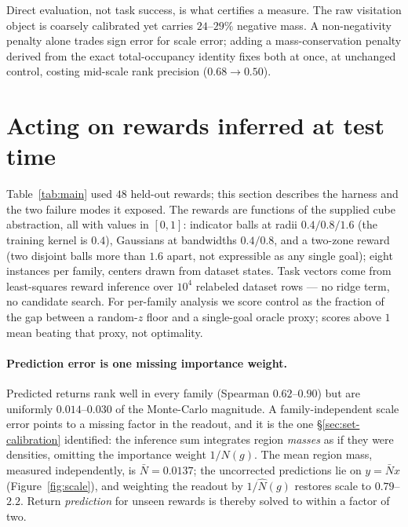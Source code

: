 \documentclass{article}
\newcommand{\Nhat}{\hat N}
\begin{document}
\begin{finding}
Direct evaluation, not task success, is what certifies a measure. The raw
visitation object is coarsely calibrated yet carries $24$--$29\%$ negative
mass. A non-negativity penalty alone trades sign error for scale error; adding
a mass-conservation penalty derived from the exact total-occupancy identity
fixes both at once, at unchanged control, costing mid-scale rank precision
($0.68\to0.50$).
\end{finding}

\section{Acting on rewards inferred at test time}
\label{sec:reward-transfer}

Table~\ref{tab:main} used $48$ held-out rewards; this section describes the
harness and the two failure modes it exposed. The rewards are functions of the
supplied cube abstraction, all with values in $[0,1]$: indicator balls at radii
$0.4/0.8/1.6$ (the training kernel is $0.4$), Gaussians at bandwidths
$0.4/0.8$, and a two-zone reward (two disjoint balls more than $1.6$ apart, not
expressible as any single goal); eight instances per family, centers drawn from
dataset states. Task vectors come from least-squares reward inference over
$10^4$ relabeled dataset rows --- no ridge term, no candidate search. For
per-family analysis we score control as the fraction of the gap between a
random-$z$ floor and a single-goal oracle proxy; scores above $1$ mean beating
that proxy, not optimality.

\paragraph{Prediction error is one missing importance weight.}
Predicted returns rank well in every family (Spearman $0.62$--$0.90$) but are
uniformly $0.014$--$0.030$ of the Monte-Carlo magnitude. A family-independent
scale error points to a missing factor in the readout, and it is the one
\S\ref{sec:set-calibration} identified: the inference sum integrates region
\emph{masses} as if they were densities, omitting the importance weight
$1/N(g)$. The mean region mass, measured independently, is $\bar N=0.0137$; the
uncorrected predictions lie on $y=\bar N x$ (Figure~\ref{fig:scale}), and
weighting the readout by $1/\Nhat(g)$ restores scale to $0.79$--$2.2$. Return
\emph{prediction} for unseen rewards is thereby solved to within a factor of
two.
\end{document}
